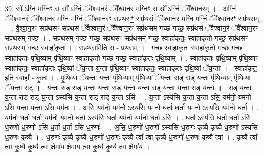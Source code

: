 \documentclass[17pt]{extarticle}
\begin{document}
39. सो᳚ ऽग्नि म॒ग्निꣳ स सो᳚ ऽग्निं ॅवै᳚श्वान॒रं ॅवै᳚श्वान॒र म॒ग्निꣳ स सो᳚ ऽग्निं ॅवै᳚श्वान॒रम् । . अ॒ग्निं ॅवै᳚श्वान॒रं ॅवै᳚श्वान॒र म॒ग्नि म॒ग्निं ॅवै᳚श्वान॒रꣳ सप्र॑थसꣳ॒॒ सप्र॑थसं ॅवैश्वान॒र म॒ग्नि म॒ग्निं ॅवै᳚श्वान॒रꣳ सप्र॑थसम् । . वै॒श्वा॒न॒रꣳ सप्र॑थसꣳ॒॒ सप्र॑थसं ॅवैश्वान॒रं ॅवै᳚श्वान॒रꣳ सप्र॑थसम् गच्छ गच्छ॒ सप्र॑थसं ॅवैश्वान॒रं ॅवै᳚श्वान॒रꣳ सप्र॑थसम् गच्छ । . सप्र॑थसम् गच्छ गच्छ॒ सप्र॑थसꣳ॒॒ सप्र॑थसम् गच्छ॒ स्वाहा॑कृतः॒ स्वाहा॑कृतो गच्छ॒ सप्र॑थसꣳ॒॒ सप्र॑थसम् गच्छ॒ स्वाहा॑कृतः । . सप्र॑थस॒मिति॒ स - प्र॒थ॒स॒म् । . ग॒च्छ॒ स्वाहा॑कृतः॒ स्वाहा॑कृतो गच्छ गच्छ॒ स्वाहा॑कृतः पृथि॒व्याम् पृ॑थि॒व्याꣳ स्वाहा॑कृतो गच्छ गच्छ॒ स्वाहा॑कृतः पृथि॒व्याम् । . स्वाहा॑कृतः पृथि॒व्याम् पृ॑थि॒व्याꣳ स्वाहा॑कृतः॒ स्वाहा॑कृतः पृथि॒व्यां ॅय॒न्ता य॒न्ता पृ॑थि॒व्याꣳ स्वाहा॑कृतः॒ स्वाहा॑कृतः पृथि॒व्यां ॅय॒न्ता । . स्वाहा॑कृत॒ इति॒ स्वाहा᳚ - कृ॒तः॒ । . पृ॒थि॒व्यां ॅय॒न्ता य॒न्ता पृ॑थि॒व्याम् पृ॑थि॒व्यां ॅय॒न्ता राड् राड् य॒न्ता पृ॑थि॒व्याम् पृ॑थि॒व्यां ॅय॒न्ता राट् । . य॒न्ता राड् राड् य॒न्ता य॒न्ता राड् य॒न्ता य॒न्ता राड् य॒न्ता य॒न्ता राड् य॒न्ता । . राड् य॒न्ता य॒न्ता राड् राड् य॒न्ता ऽस्य॑सि य॒न्ता राड् राड् य॒न्ता ऽसि॑ । . य॒न्ता ऽस्य॑सि य॒न्ता य॒न्ता ऽसि॒ यम॑नो॒ यम॑नो ऽसि य॒न्ता य॒न्ता ऽसि॒ यम॑नः । . अ॒सि॒ यम॑नो॒ यम॑नो ऽस्यसि॒ यम॑नो ध॒र्ता ध॒र्ता यम॑नो ऽस्यसि॒ यम॑नो ध॒र्ता । . यम॑नो ध॒र्ता ध॒र्ता यम॑नो॒ यम॑नो ध॒र्ता ऽस्य॑सि ध॒र्ता यम॑नो॒ यम॑नो ध॒र्ता ऽसि॑ । . ध॒र्ता ऽस्य॑सि ध॒र्ता ध॒र्ता ऽसि॑ ध॒रुणो॑ ध॒रुणो॑ ऽसि ध॒र्ता ध॒र्ता ऽसि॑ ध॒रुणः॑ । . अ॒सि॒ ध॒रुणो॑ ध॒रुणो᳚ ऽस्यसि ध॒रुणः॑ कृ॒ष्यै कृ॒ष्यै ध॒रुणो᳚ ऽस्यसि ध॒रुणः॑ कृ॒ष्यै । . ध॒रुणः॑ कृ॒ष्यै कृ॒ष्यै ध॒रुणो॑ ध॒रुणः॑ कृ॒ष्यै त्वा᳚ त्वा कृ॒ष्यै ध॒रुणो॑ ध॒रुणः॑ कृ॒ष्यै त्वा᳚ । . कृ॒ष्यै त्वा᳚ त्वा कृ॒ष्यै कृ॒ष्यै त्वा॒ क्षेमा॑य॒ क्षेमा॑य त्वा कृ॒ष्यै कृ॒ष्यै त्वा॒ क्षेमा॑य । \newline
\end{document}
